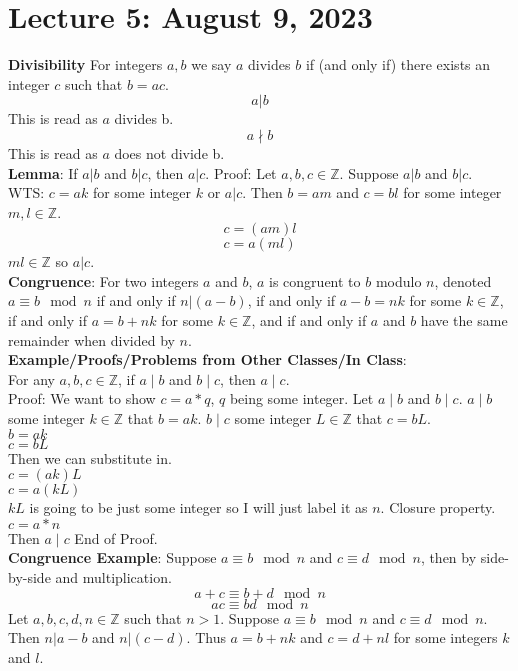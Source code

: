 \documentclass{article}
\begin{document}
\section{Lecture 5: August 9, 2023}
\textbf{Divisibility} For integers \(a,b\) we say \(a\) divides \(b\) if (and only if) there exists an integer \(c\) such that \(b = ac\).
\[a|b\]
This is read as \(a\) divides b.
\[a\nmid b\]
This is read as \(a\) does not divide b.\\
\textbf{Lemma}: If \(a|b\) and \(b|c\), then \(a|c\). Proof: Let \(a,b,c \in \mathbb{Z}\). Suppose \(a|b\) and \(b|c\). WTS: \(c = ak\) for some integer \(k\) or \(a|c\). Then \(b = am\) and \(c = bl\) for some integer \(m,l \in \mathbb{Z}\).
\[c = (am)l\]
\[c = a(ml)\]
\(ml \in \mathbb{Z}\) so \(a|c\).\\
\textbf{Congruence}: For two integers \(a\) and \(b\), \(a\) is congruent to \(b\) modulo \(n\), denoted \(a \equiv b \mod n\) if and only if \(n | (a-b)\), if and only if \(a-b=nk\) for some \(k \in \mathbb{Z}\), if and only if \(a = b+nk\) for some \(k \in \mathbb{Z}\), and if and only if \(a\) and \(b\) have the same remainder when divided by \(n\).\\
\textbf{Example/Proofs/Problems from Other Classes/In Class}:\\
For any \(a,b,c \in \mathbb{Z}\), if \(a\mid b\) and \(b\mid c\),
then \(a \mid c\).\\
Proof: We want to show \(c = a * q\), \(q\) being some integer. Let \(a \mid b\) and \(b \mid c\). \(a \mid b\) some integer \(k \in \mathbb{Z}\) that \(b = ak\). \(b \mid c\) some integer  \(L \in \mathbb{Z}\) that \(c = bL\).\\
\(b = ak\)\\
\(c = bL\)\\
Then we can substitute in.\\
\(c = (ak)L\)\\
\(c = a(kL)\)\\
\(kL\) is going to be just some integer so I will just label it as \(n\). Closure property.\\
\(c = a * n\)\\
Then \(a \mid c\) End of Proof.\\
\textbf{Congruence Example}: Suppose \(a \equiv b \mod n\) and \(c \equiv d \mod n\), then by side-by-side and multiplication.
\[a+c \equiv b + d \mod n\]
\[ac \equiv bd \mod n\]
Let \(a,b,c,d,n \in \mathbb{Z}\) such that \(n > 1\). Suppose \(a \equiv b \mod n\) and \(c \equiv d \mod n\). Then \(n | a-b\) and \(n | (c-d)\). Thus \(a = b + nk\) and \(c = d+nl\) for some integers \(k\) and \(l\).
\end{document}

